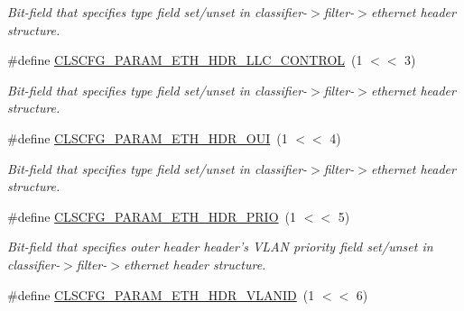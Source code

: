 \begin{DoxyCompactItemize}
\begin{DoxyCompactList}\small\item\em Bit-\/field that specifies type field set/unset in classifier-\/$>$filter-\/$>$ethernet header structure. \end{DoxyCompactList}\item 
\hypertarget{group__FAPI__QOS__CLASS_gaf021a287d12fba2a2f1d77204c297748}{\#define \hyperlink{group__FAPI__QOS__CLASS_gaf021a287d12fba2a2f1d77204c297748}{C\-L\-S\-C\-F\-G\-\_\-\-P\-A\-R\-A\-M\-\_\-\-E\-T\-H\-\_\-\-H\-D\-R\-\_\-\-L\-L\-C\-\_\-\-C\-O\-N\-T\-R\-O\-L}~(1 $<$$<$ 3)}\label{group__FAPI__QOS__CLASS_gaf021a287d12fba2a2f1d77204c297748}

\begin{DoxyCompactList}\small\item\em Bit-\/field that specifies type field set/unset in classifier-\/$>$filter-\/$>$ethernet header structure. \end{DoxyCompactList}\item 
\hypertarget{group__FAPI__QOS__CLASS_ga76f64d19269843dfa7c964b9087b220c}{\#define \hyperlink{group__FAPI__QOS__CLASS_ga76f64d19269843dfa7c964b9087b220c}{C\-L\-S\-C\-F\-G\-\_\-\-P\-A\-R\-A\-M\-\_\-\-E\-T\-H\-\_\-\-H\-D\-R\-\_\-\-O\-U\-I}~(1 $<$$<$ 4)}\label{group__FAPI__QOS__CLASS_ga76f64d19269843dfa7c964b9087b220c}

\begin{DoxyCompactList}\small\item\em Bit-\/field that specifies type field set/unset in classifier-\/$>$filter-\/$>$ethernet header structure. \end{DoxyCompactList}\item 
\hypertarget{group__FAPI__QOS__CLASS_ga06465865917637ebdc92b0d6aeef562a}{\#define \hyperlink{group__FAPI__QOS__CLASS_ga06465865917637ebdc92b0d6aeef562a}{C\-L\-S\-C\-F\-G\-\_\-\-P\-A\-R\-A\-M\-\_\-\-E\-T\-H\-\_\-\-H\-D\-R\-\_\-\-P\-R\-I\-O}~(1 $<$$<$ 5)}\label{group__FAPI__QOS__CLASS_ga06465865917637ebdc92b0d6aeef562a}

\begin{DoxyCompactList}\small\item\em Bit-\/field that specifies outer header header's V\-L\-A\-N priority field set/unset in classifier-\/$>$filter-\/$>$ethernet header structure. \end{DoxyCompactList}\item 
\hypertarget{group__FAPI__QOS__CLASS_ga3323c094841c5190b021c8948689fc96}{\#define \hyperlink{group__FAPI__QOS__CLASS_ga3323c094841c5190b021c8948689fc96}{C\-L\-S\-C\-F\-G\-\_\-\-P\-A\-R\-A\-M\-\_\-\-E\-T\-H\-\_\-\-H\-D\-R\-\_\-\-V\-L\-A\-N\-I\-D}~(1 $<$$<$ 6)}\label{group__FAPI__QOS__CLASS_ga3323c094841c5190b021c8948689fc96}


\end{DoxyCompactItemize}
